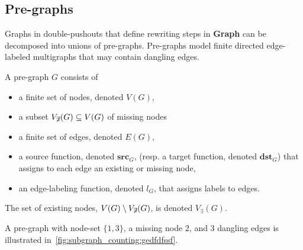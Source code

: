 \subsection{Pre-graphs}
Graphs in double-pushouts that define rewriting steps in \textbf{Graph} can be decomposed into unions of pre-graphs. Pre-graphs model finite directed edge-labeled multigraphs that may contain dangling edges.
\begin{definition}
    \label{def:pre-graph}
    A pre-graph $G$ consists of
    \begin{itemize}
        \item a finite set of nodes, denoted $V(G)$,
        \item a subset $V_{\not \exists}(G) \subseteq V(G)$ of missing nodes
        \item a finite set of edges, denoted $E(G)$,
        \item a source function, denoted \( \textbf{src}_G \), (resp. a target function, denoted \( \textbf{dst}_G \)) that assigns to each edge an existing or missing node,
        \item an edge-labeling function, denoted $l_G$, that assigns labels to edges.
    \end{itemize}
\end{definition} 
The set of existing nodes, $V(G) \setminus V_{\not \exists}(G)$, is denoted $V_\exists(G)$.

 \begin{example}
    \label{def:pregraph}
     A pre-graph with node-set $\{1,3\}$, a missing node $2$, and 3 dangling edges is illustrated in~\autoref{fig:subgraph_counting:gedfdfssf}.
     \begin{figure}[!htbp]
        \centering
    \caption{}
    \label{fig:subgraph_counting:gedfdfssf}
    \end{figure}
 \end{example}
 
